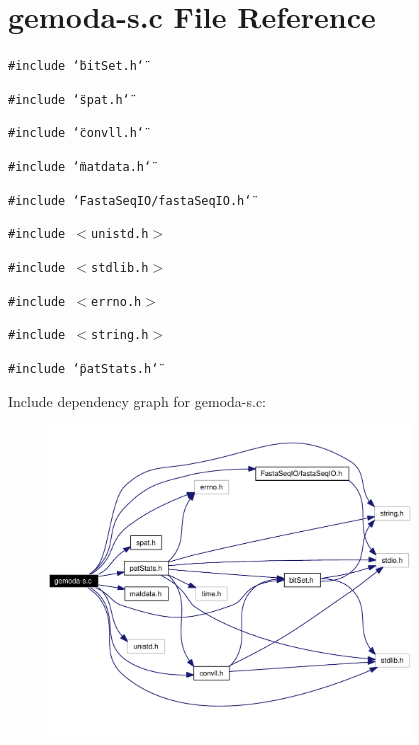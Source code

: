 \hypertarget{gemoda-s_8c}{
\section{gemoda-s.c File Reference}
\label{gemoda-s_8c}
}
{\tt \#include \char`\"{}bit\-Set.h\char`\"{}}\par
{\tt \#include \char`\"{}spat.h\char`\"{}}\par
{\tt \#include \char`\"{}convll.h\char`\"{}}\par
{\tt \#include \char`\"{}matdata.h\char`\"{}}\par
{\tt \#include \char`\"{}Fasta\-Seq\-IO/fasta\-Seq\-IO.h\char`\"{}}\par
{\tt \#include $<$unistd.h$>$}\par
{\tt \#include $<$stdlib.h$>$}\par
{\tt \#include $<$errno.h$>$}\par
{\tt \#include $<$string.h$>$}\par
{\tt \#include \char`\"{}pat\-Stats.h\char`\"{}}\par


Include dependency graph for gemoda-s.c:\begin{figure}[H]
\begin{center}
\leavevmode
\includegraphics[width=272pt]{gemoda-s_8c__incl}
\end{center}
\end{figure}
